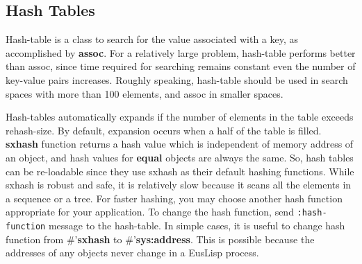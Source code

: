 \subsection{Hash Tables}

Hash-table is a class to search for the value associated with a key,
as accomplished by {\bf assoc}.
For a relatively large problem,
hash-table performs better than assoc, since time required for searching remains constant even
the number of key-value pairs increases.
Roughly speaking, hash-table should be used in search spaces with
more than 100 elements, and assoc in smaller spaces.

Hash-tables automatically expands if the number of elements
in the table exceeds rehash-size.
By default, expansion occurs when a half of the table is filled.
{\bf sxhash} function returns a hash value which is independent
of memory address of an object, and hash values for {\bf equal} objects
are always the same.
So, hash tables can be re-loadable since they use sxhash as their default
hashing functions.
While sxhash is robust and safe,
it is relatively slow because it scans all the elements 
in a sequence or a tree.
For faster hashing, you may choose another hash function appropriate
for your application.
To change the hash function, send {\tt :hash-function} message
to the hash-table.
In simple cases, it is useful to change hash function from \#'{\bf sxhash}
to \#'{\bf sys:address}.
This is possible because the addresses of any objects
never change in a EusLisp process.

